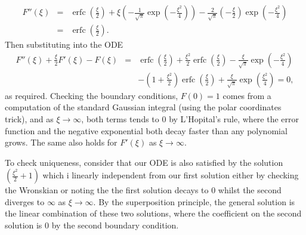 \documentclass{article}
\begin{document}
\begin{eqnarray*}
    F''(\xi) & = & \mathop{\mathrm{erfc}}\left(\frac{\xi}{2}\right) + \xi\left(-\frac{1}{\sqrt{\pi}}\exp\left(-\frac{\xi^2}{4}\right) \right) - \frac{2}{\sqrt{\pi}}\left(-\frac{\xi}{2}\right)\exp\left(-\frac{\xi^2}{4}\right) \\
             & = & \mathop{\mathrm{erfc}}\left(\frac{\xi}{2}\right).
\end{eqnarray*}
Then substituting into the ODE
\begin{eqnarray*}
    F''(\xi) + \frac{\xi}{2}F'(\xi) - F(\xi) & = & 
    \mathop{\mathrm{erfc}}\left(\frac{\xi}{2}\right)
    + \frac{\xi^2}{2} \mathop{\mathrm{erfc}}\left(\frac{\xi}{2}\right) - \frac{\xi}{\sqrt{\pi}}\exp\left(-\frac{\xi^2}{4}\right) \\
    & & - \left(1 + \frac{\xi^2}{2}\right)\mathop{\mathrm{erfc}}\left(\frac{\xi}{2}\right) + \frac{\xi}{\sqrt{\pi}}\exp\left(\frac{\xi^2}{4}\right) = 0,
\end{eqnarray*} 
as required. Checking the boundary conditions, \(F(0) = 1\) comes from a computation of the standard Gaussian integral (using the polar coordinates trick), and as \(\xi \to \infty\), both terms tends to \(0\) by L'Hopital's rule, where the error function and the negative exponential both decay faster than any polynomial grows. The same also holds for \(F'(\xi)\) as \(\xi \to \infty\).

To check uniqueness, consider that our ODE is also satisfied by the solution \((\frac{\xi^2}{2} + 1)\) which i linearly independent from our first solution either by checking the Wronskian or noting the the first solution decays to \(0\) whilst the second diverges to \(\infty\) as \(\xi \to \infty\). By the superposition principle, the general solution is the linear combination of these two solutions, where the coefficient on the second solution is \(0\) by the second boundary condition.
\end{document}
